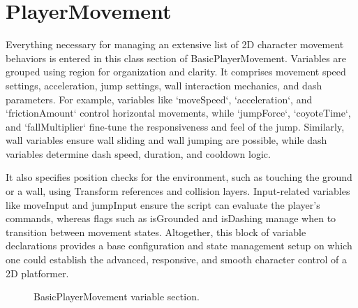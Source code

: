 \documentclass[12pt,oneside,openright,a4paper]{cpe-english-project}
\begin{document}
\section{PlayerMovement }
Everything necessary for managing an extensive list of 2D character movement behaviors is entered in this class section of BasicPlayerMovement. Variables are grouped using region for organization and clarity. It comprises movement speed settings, acceleration, jump settings, wall interaction mechanics, and dash parameters. For example, variables like `moveSpeed`, `acceleration`, and `frictionAmount` control horizontal movements, while `jumpForce`, `coyoteTime`, and `fallMultiplier` fine-tune the responsiveness and feel of the jump. Similarly, wall variables ensure wall sliding and wall jumping are possible, while dash variables determine dash speed, duration, and cooldown logic.\par
It also specifies position checks for the environment, such as touching the ground or a wall, using Transform references and collision layers. Input-related variables like moveInput and jumpInput ensure the script can evaluate the player’s commands, whereas flags such as isGrounded and isDashing manage when to transition between movement states. Altogether, this block of variable declarations provides a base configuration and state management setup on which one could establish the advanced, responsive, and smooth character control of a 2D platformer.\par
 \begin{figure}[!h]
 \centering
\caption{BasicPlayerMovement variable section.}\label{fig:Var}
\end{figure}
\end{document}
